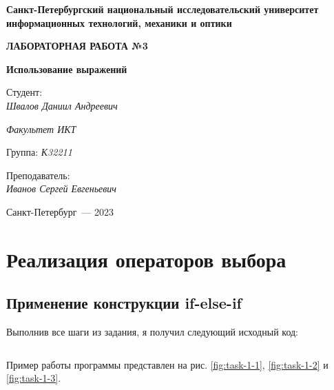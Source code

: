 \documentclass[a4paper,14pt]{extarticle}
\numberwithin{figure}{section}
\begin{document}
\begin{titlepage}
    \vspace{0pt plus2fill}
    \noindent

    \vspace{0pt plus6fill}
    \begin{center}
        \textbf{\large{Санкт-Петербургский национальный исследовательский университет информационных
                технологий, механики и оптики}}

        \vspace{0pt plus2fill}
        \textbf{\Large{ЛАБОРАТОРНАЯ РАБОТА №3}}

        \vspace{0pt plus2fill}
        \textbf{\large{Использование выражений}}
    \end{center}

    \vspace{0pt plus8fill}
    \begin{flushright}
        Студент: \\
        \textit{Швалов Даниил Андреевич}

        \textit{Факультет ИКТ}

        Группа: \textit{К32211}

        Преподаватель: \\
        \textit{Иванов Сергей Евгеньевич}
    \end{flushright}

    \vspace{0pt plus4fill}
    \begin{center}
        {Санкт-Петербург~--- 2023}
    \end{center}
\end{titlepage}

\section{Реализация операторов выбора}

\subsection{Применение конструкции if-else-if}

Выполнив все шаги из задания, я получил следующий исходный код:
\inputminted{csharp}{../Shapeifelse/Shapeifelse/Program.cs}

Пример работы программы представлен на рис. \ref{fig:task-1-1}, \ref{fig:task-1-2} и \ref{fig:task-1-3}.
\end{document}
